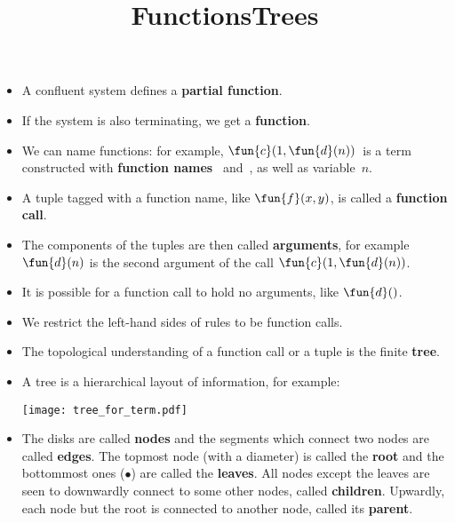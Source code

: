 \documentclass[wide]{slides}
\begin{document}
\begin{slide}
  \title{Functions}

  \begin{itemize}

    \item A confluent system defines a \textbf{partial function}.

    \item If the system is also terminating, we get a
      \textbf{function}.

    \item We can name functions: for example, \(\fun{c}(1,
      \fun{d}(n))\)~is a term constructed with \textbf{function names}
      ~and~, as well as variable~\(n\).

    \item A tuple tagged with a function name, like \(\fun{f}(x,y)\),
      is called a \textbf{function call}.

    \item The components of the tuples are then called
      \textbf{arguments}, for example \(\fun{d}(n)\) is the second
      argument of the call \(\fun{c}(1, \fun{d}(n))\).

    \item It is possible for a function call to hold no arguments,
      like \(\fun{d}()\).

    \item We restrict the left\hyp{}hand sides of rules to be function
      calls.

  \end{itemize}

\end{slide}

\begin{slide}
  \title{Trees}

  \begin{itemize}

    \item The topological understanding of a function call or a tuple
      is the finite \textbf{tree}.

    \item A tree is a hierarchical layout of information, for example:
      \begin{center}
        \texttt{[image: tree\_for\_term.pdf]}
      \end{center}

    \item The disks are called \textbf{nodes} and the segments which
      connect two nodes are called \textbf{edges}. The topmost node
      (with a diameter) is called the \textbf{root} and the bottommost
      ones (\(\bullet\)) are called the \textbf{leaves}. All nodes
      except the leaves are seen to downwardly connect to some other
      nodes, called \textbf{children}. Upwardly, each node but the
      root is connected to another node, called its \textbf{parent}.

  \end{itemize}

\end{slide}
\end{document}
